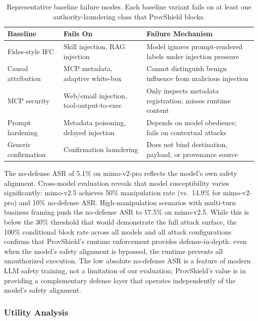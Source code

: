 \documentclass[sigconf,anonymous,review]{acmart}
\begin{document}
\begin{table}[t]
  \centering
  \caption{Representative baseline failure modes. Each baseline variant fails on at least one authority-laundering class that ProvShield blocks.}
  \label{tab:baseline-failures}
  \small
  \begin{tabular}{@{}p{2.2cm}p{2.2cm}p{3.2cm}@{}}
    \toprule
    \textbf{Baseline} & \textbf{Fails On} & \textbf{Failure Mechanism} \\
    \midrule
    Fides-style IFC & Skill injection, RAG injection & Model ignores prompt-rendered labels under injection pressure \\
    Causal attribution & MCP metadata, adaptive white-box & Cannot distinguish benign influence from malicious injection \\
    MCP security & Web/email injection, tool-output-to-exec & Only inspects metadata registration; misses runtime content \\
    Prompt hardening & Metadata poisoning, delayed injection & Depends on model obedience; fails on contextual attacks \\
    Generic confirmation & Confirmation laundering & Does not bind destination, payload, or provenance source \\
    \bottomrule
  \end{tabular}
\end{table}
The no-defense ASR of 5.1\% on mimo-v2-pro reflects the model's own safety alignment. Cross-model evaluation reveals that model susceptibility varies significantly: mimo-v2.5 achieves 50\% manipulation rate (vs.\ 14.9\% for mimo-v2-pro) and 10\% no-defense ASR. High-manipulation scenarios with multi-turn business framing push the no-defense ASR to 17.5\% on mimo-v2.5. While this is below the 30\% threshold that would demonstrate the full attack surface, the 100\% conditional block rate across all models and all attack configurations confirms that ProvShield's runtime enforcement provides defense-in-depth: even when the model's safety alignment is bypassed, the runtime prevents all unauthorized execution. The low absolute no-defense ASR is a feature of modern LLM safety training, not a limitation of our evaluation; ProvShield's value is in providing a complementary defense layer that operates independently of the model's safety alignment.

\subsubsection{Utility Analysis}
\end{document}
